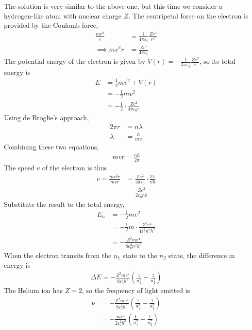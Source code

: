 \documentclass[12pt]{book} %
\numberwithin{equation}{chapter}
\def\D{\Delta}
\def\e{\varepsilon}
\def\l{\lambda}
\begin{document}
\begin{solbox}
The solution is very similar to the above one, but this time we consider a hydrogen-like atom with nuclear charge $Z$.\bigskip\newline
The centripetal force on the electron is provided by the Coulomb force,
\begin{align*}
\frac{mv^{2}}{r}&=\frac{1}{4\pi\e_{0}}\frac{Ze^{2}}{r^{2}}\\
\implies mv^{2}r&=\frac{Ze^{2}}{4\pi\e_{0}}
\end{align*}
The potential energy of the electron is given by $V(r)=-\frac{1}{4\pi\e_{0}}\frac{Ze^{2}}{r}$, so its total energy is
\begin{align*}
E&=\frac{1}{2}mv^{2}+V(r)\\
&=-\frac{1}{2}mv^{2}\\
&=-\frac{1}{2}\cdot\frac{Ze^{2}}{4\pi\e_{0}r}
\end{align*}
Using de Broglie's approach,
\begin{align*}
2\pi r&=n\l\\
\l&=\frac{h}{mv}
\end{align*}
Combining these two equations,
\begin{align*}
mvr=\frac{nh}{2\pi}
\end{align*}
The speed $v$ of the electron is thus
\begin{align*}
v=\frac{mv^{2}r}{mvr}&=\frac{Ze^{2}}{4\pi\e_{0}}\cdot \frac{2\pi}{nh}\\
&=\frac{Ze^{2}}{2\e_{0}nh}
\end{align*}
Substitute the result to the total energy,
\begin{align*}
E_{n}&=-\frac{1}{2}mv^{2}\\
&=-\frac{1}{2}m\cdot \frac{Z^{2}e^{4}}{4\e_{0}^{2}n^{2}h^{2}}\\
&=-\frac{Z^{2}me^{4}}{8\e_{0}^{2}n^{2}h^{2}}
\end{align*}
When the electron transits from the $n_{1}$ state to the $n_{2}$ state, the difference in energy is
\begin{align*}
\D E=-\frac{Z^{2}me^{4}}{8\e_{0}^{2}h^{2}}\left(\frac{1}{n_{1}^{2}}-\frac{1}{n_{2}^{2}}\right)
\end{align*}
The Helium ion has $Z=2$, so the frequency of light emitted is
\begin{align*}
\nu&=-\frac{Z^{2}me^{4}}{8\e_{0}^{2}h^{3}}\left(\frac{1}{n_{1}^{2}}-\frac{1}{n_{2}^{2}}\right)\\
&=-\frac{me^{4}}{2\e_{0}^{2}h^{3}}\left(\frac{1}{n_{1}^{2}}-\frac{1}{n_{2}^{2}}\right)
\end{align*}
\end{solbox}
\end{document}
